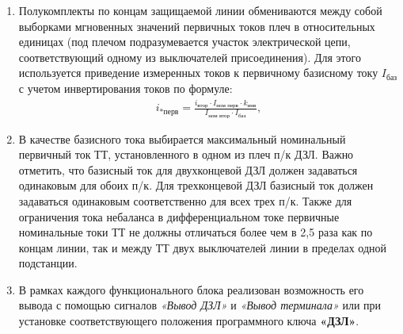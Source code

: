 \begin{enumerate}[label=\arabic{section}.\arabic{subsection}.\arabic{enumi}, labelsep=4pt, leftmargin=0pt, itemindent=57pt, itemsep=0pt, parsep=5pt]
\begin{enumerate}[label=\arabic{section}.\arabic{subsection}.\arabic{enumi}.\arabic*, labelsep=4pt, leftmargin=0em, itemindent=65pt, parsep=0pt]
\item
Полукомплекты по концам защищаемой линии обмениваются между собой выборками мгновенных значений первичных токов плеч в относительных единицах (под плечом подразумевается участок электрической цепи, соответствующий одному из выключателей присоединения).
Для этого используется приведение измеренных токов к первичному базисному току $ I_{\textit{баз}} $  с учетом инвертирования токов по формуле:
\begin{align}
i_{\textit{*перв}}=\frac{i_{\textit{втор}} \cdot I_{\textit{ном перв}} \cdot k_{\textit{инв}}}{I_{\textit{ном втор}} \cdot I_{\textit{баз}}},
\end{align}

\item
В качестве базисного тока выбирается максимальный номинальный первичный ток ТТ, установленного в одном из плеч п/к ДЗЛ.
Важно отметить, что базисный ток для двухконцевой ДЗЛ должен задаваться одинаковым для обоих п/к.
Для трехконцевой ДЗЛ базисный ток должен задаваться одинаковым соответственно для всех трех п/к.
Также для ограничения тока небаланса в дифференциальном токе первичные номинальные токи ТТ не должны отличаться более чем в 2,5 раза как по концам линии, так и между ТТ двух выключателей линии в пределах одной подстанции.

\item
В рамках каждого функционального блока реализован возможность его вывода с помощью сигналов \textit{«Вывод ДЗЛ»} и \textit{«Вывод терминала»} или при установке соответствующего положения программного ключа \textbf{«ДЗЛ»}.


\end{enumerate}
\end{enumerate}
